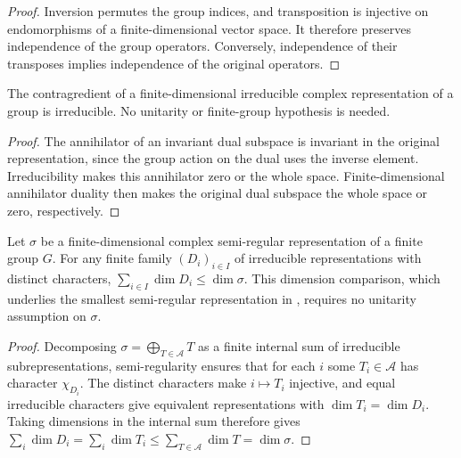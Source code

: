 \begin{proof}\leanok
    Inversion permutes the group indices, and transposition is injective
    on endomorphisms of a finite-dimensional vector space. It therefore
    preserves independence of the group operators. Conversely,
    independence of their transposes implies independence of the
    original operators.
\end{proof}

\begin{lemma}
    \label{thm:peps_irreducible_dual}
    \leanok
    The contragredient of a finite-dimensional irreducible complex
    representation of a group is irreducible. No unitarity or finite-group
    hypothesis is needed.
\end{lemma}

\begin{proof}\leanok
    The annihilator of an invariant dual subspace is invariant in the
    original representation, since the group action on the dual uses
    the inverse element. Irreducibility makes this annihilator zero or
    the whole space. Finite-dimensional annihilator duality then makes
    the original dual subspace the whole space or zero, respectively.
\end{proof}

\begin{lemma}
    \label{thm:peps_semiregular_dimension_bound}
    \leanok
    Let $\sigma$ be a finite-dimensional complex semi-regular representation
    of a finite group $G$. For any finite family $(D_i)_{i\in I}$ of
    irreducible representations with distinct characters,
    $\sum_{i\in I}\dim D_i\leq\dim\sigma$.
    This dimension comparison, which underlies the smallest semi-regular
    representation in \cite[Section~7]{Schuch2010PEPS}, requires no unitarity
    assumption on $\sigma$.
\end{lemma}

\begin{proof}\leanok
    Decomposing $\sigma=\bigoplus_{T\in\mathcal A}T$ as a finite internal sum
    of irreducible subrepresentations, semi-regularity ensures that for each
    $i$ some $T_i\in\mathcal A$ has character $\chi_{D_i}$.
    The distinct characters make $i\mapsto T_i$ injective, and equal
    irreducible characters give equivalent representations with
    $\dim T_i=\dim D_i$.
    Taking dimensions in the internal sum therefore gives
    $\sum_i\dim D_i=\sum_i\dim T_i\leq
        \sum_{T\in\mathcal A}\dim T=\dim\sigma$.
\end{proof}

